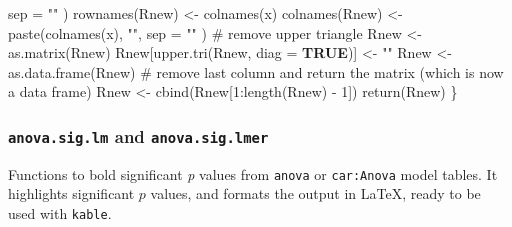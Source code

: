 \documentclass[
  bookmarksnumbered]{article}
\newenvironment{Shaded}{\begin{snugshade}}{\end{snugshade}}
\newcommand{\AttributeTok}[1]{\textcolor[rgb]{0.80,0.80,0.80}{#1}}
\newcommand{\CommentTok}[1]{\textcolor[rgb]{0.50,0.62,0.50}{#1}}
\newcommand{\ConstantTok}[1]{\textcolor[rgb]{0.86,0.64,0.64}{\textbf{#1}}}
\newcommand{\DecValTok}[1]{\textcolor[rgb]{0.86,0.86,0.80}{#1}}
\newcommand{\FunctionTok}[1]{\textcolor[rgb]{0.94,0.94,0.56}{#1}}
\newcommand{\NormalTok}[1]{\textcolor[rgb]{0.80,0.80,0.80}{#1}}
\newcommand{\OtherTok}[1]{\textcolor[rgb]{0.94,0.94,0.56}{#1}}
\newcommand{\SpecialCharTok}[1]{\textcolor[rgb]{0.86,0.64,0.64}{#1}}
\newcommand{\StringTok}[1]{\textcolor[rgb]{0.80,0.58,0.58}{#1}}
\begin{document}
\begin{Shaded}
\begin{Highlighting}[]
    \AttributeTok{sep =} \StringTok{""}
\NormalTok{  )}
  \FunctionTok{rownames}\NormalTok{(Rnew) }\OtherTok{\textless{}{-}} \FunctionTok{colnames}\NormalTok{(x)}
  \FunctionTok{colnames}\NormalTok{(Rnew) }\OtherTok{\textless{}{-}} \FunctionTok{paste}\NormalTok{(}\FunctionTok{colnames}\NormalTok{(x), }\StringTok{""}\NormalTok{,}
    \AttributeTok{sep =} \StringTok{""}
\NormalTok{  )}
  \CommentTok{\# remove upper triangle}
\NormalTok{  Rnew }\OtherTok{\textless{}{-}} \FunctionTok{as.matrix}\NormalTok{(Rnew)}
\NormalTok{  Rnew[}\FunctionTok{upper.tri}\NormalTok{(Rnew, }\AttributeTok{diag =} \ConstantTok{TRUE}\NormalTok{)] }\OtherTok{\textless{}{-}} \StringTok{""}
\NormalTok{  Rnew }\OtherTok{\textless{}{-}} \FunctionTok{as.data.frame}\NormalTok{(Rnew)}
  \CommentTok{\# remove last column and return the matrix (which is now a data frame)}
\NormalTok{  Rnew }\OtherTok{\textless{}{-}} \FunctionTok{cbind}\NormalTok{(Rnew[}\DecValTok{1}\SpecialCharTok{:}\FunctionTok{length}\NormalTok{(Rnew) }\SpecialCharTok{{-}} \DecValTok{1}\NormalTok{])}
  \FunctionTok{return}\NormalTok{(Rnew)}
\NormalTok{\}}
\end{Highlighting}
\end{Shaded}

\subsubsection{\texorpdfstring{\texttt{anova.sig.lm} and \texttt{anova.sig.lmer}}{anova.sig.lm and anova.sig.lmer}}\label{anova.sig.lm-and-anova.sig.lmer}

Functions to bold significant \emph{p} values from \texttt{anova} or \texttt{car:Anova} model tables. It highlights significant \(p\) values, and formats the output in \LaTeX, ready to be used with \texttt{kable}.
\end{document}
